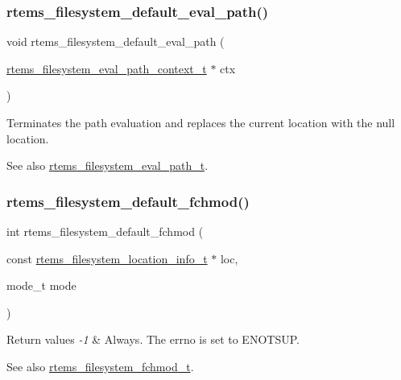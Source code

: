 \subsubsection{\texorpdfstring{rtems\_filesystem\_default\_eval\_path()}{rtems\_filesystem\_default\_eval\_path()}}
{\footnotesize\ttfamily void rtems\+\_\+filesystem\+\_\+default\+\_\+eval\+\_\+path (\begin{DoxyParamCaption}\item[{\mbox{\hyperlink{structrtems__filesystem__eval__path__context__t}{rtems\+\_\+filesystem\+\_\+eval\+\_\+path\+\_\+context\+\_\+t}} $\ast$}]{ctx }\end{DoxyParamCaption})}



Terminates the path evaluation and replaces the current location with the null location. 

\begin{DoxySeeAlso}{See also}
\mbox{\hyperlink{group__LibIOFSOps_ga49260fbd8e55e1ecb71daef115c751c4}{rtems\+\_\+filesystem\+\_\+eval\+\_\+path\+\_\+t}}. 
\end{DoxySeeAlso}
\mbox{\label{group__LibIOFSOps_ga3dd804eb9c4578e02e07eb0ee445af43}} 
\subsubsection{\texorpdfstring{rtems\_filesystem\_default\_fchmod()}{rtems\_filesystem\_default\_fchmod()}}
{\footnotesize\ttfamily int rtems\+\_\+filesystem\+\_\+default\+\_\+fchmod (\begin{DoxyParamCaption}\item[{const \mbox{\hyperlink{group__LibIO_ga3252b3d31ee3c49ffff0b7604a676864}{rtems\+\_\+filesystem\+\_\+location\+\_\+info\+\_\+t}} $\ast$}]{loc,  }\item[{mode\+\_\+t}]{mode }\end{DoxyParamCaption})}


\begin{DoxyRetVals}{Return values}
{\em -\/1} & Always. The errno is set to E\+N\+O\+T\+S\+UP.\\
\hline
\end{DoxyRetVals}
\begin{DoxySeeAlso}{See also}
\mbox{\hyperlink{group__LibIOFSOps_ga1b1d7f7442b24fc05ffedc596f1cec4b}{rtems\+\_\+filesystem\+\_\+fchmod\+\_\+t}}. 
\end{DoxySeeAlso}
\mbox{\label{group__LibIOFSOps_ga801a36a04179ec2431409303fa1b9031}} 
